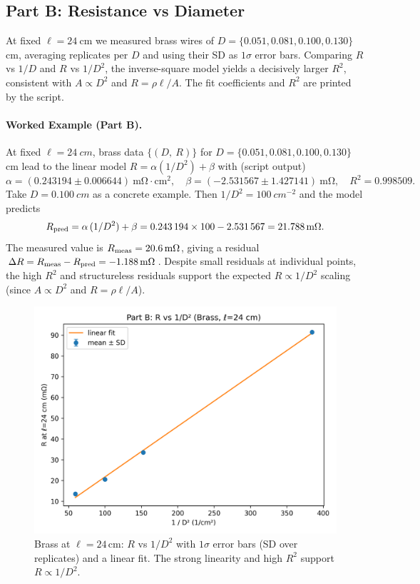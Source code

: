 \documentclass[12pt]{article}
\numberwithin{equation}{section}
\begin{document}
\subsection{Part B: Resistance vs Diameter}
At fixed $\ell=\SI{24}{\centi\metre}$ we measured brass wires of $D=\{0.051,0.081,0.100,0.130\}$\,cm, averaging replicates per $D$ and using their SD as $1\sigma$ error bars. Comparing $R$ vs $1/D$ and $R$ vs $1/D^2$, the inverse-square model yields a decisively larger $R^2$, consistent with $A\propto D^2$ and $R=\rho\ell/A$. The fit coefficients and $R^2$ are printed by the script.
\paragraph*{Worked Example (Part B).}
At fixed $\ell=\SI{24}{cm}$, brass data $\{(D,\ R)\}$ for $D=\{0.051,0.081,0.100,0.130\}$\,cm
lead to the linear model $R = \alpha(1/D^2)+\beta$ with (script output)
\[
\alpha=(\num{0.243194}\pm\num{0.006644})~\mathrm{m\Omega\cdot cm^2},\quad
\beta=(\num{-2.531567}\pm\num{1.427141})~\mathrm{m\Omega},\quad
R^2=\num{0.998509}.
\]
Take $D=\SI{0.100}{cm}$ as a concrete example. Then $1/D^2=\SI{100}{cm^{-2}}$ and the model predicts
\[
R_{\rm pred}=\alpha\,(1/D^2)+\beta=\num{0.243194}\times 100 - \num{2.531567}
= \SI{21.788}{m\Omega}.
\]
The measured value is $R_{\rm meas}=\SI{20.6}{m\Omega}$, giving a residual
$\Delta R=R_{\rm meas}-R_{\rm pred}=\SI{-1.188}{m\Omega}$.
Despite small residuals at individual points, the high $R^2$ and structureless residuals support the expected
$R\propto 1/D^2$ scaling (since $A\propto D^2$ and $R=\rho\ell/A$).

\begin{figure}[h]
  \centering
  \includegraphics[width=0.72\linewidth]{figs/PartB_R_vs_invD2.png}
  \caption{Brass at $\ell=24$\,cm: $R$ vs $1/D^2$ with $1\sigma$ error bars (SD over replicates) and a linear fit. The strong linearity and high $R^2$ support $R\propto 1/D^2$.}
  \label{fig:partB}
\end{figure}
\FloatBarrier
\end{document}
